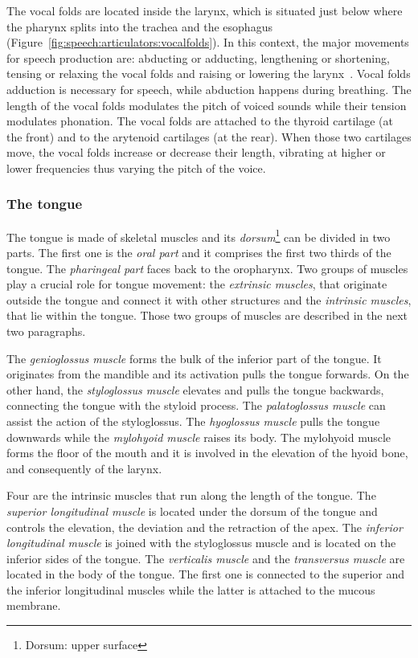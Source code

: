 
The vocal folds are located inside the larynx, which is situated just below
where the pharynx splits into the trachea and the esophagus
(Figure~\ref{fig:speech:articulators:vocalfolds}).
In this context, the major movements for speech production are: abducting or
adducting, lengthening or shortening, tensing or relaxing the vocal folds and 
raising or lowering the larynx~\citep{epstein.etal:2002}.
Vocal folds adduction is necessary for speech, while abduction happens
during breathing. The length of the vocal folds modulates the pitch of voiced
sounds while their tension modulates phonation.
The vocal folds are attached to the thyroid cartilage (at the front) and to the 
arytenoid cartilages (at the rear). When those two cartilages move, the vocal
folds increase or decrease their length, vibrating at higher or lower
frequencies thus varying the pitch of the voice. 

\subsubsection{The tongue}
The tongue is made of skeletal muscles and its \emph{dorsum}\footnote{Dorsum:
upper surface} can be divided in two parts.
The first one is the \emph{oral part} and it comprises the first two thirds of
the tongue. The \emph{pharingeal part} faces back to the oropharynx.
Two groups of muscles play a crucial role for tongue movement:
the \emph{extrinsic muscles}, that originate
outside the tongue and connect it with other structures 
and the \emph{intrinsic muscles}, that lie within the tongue.
Those two groups of muscles are described in the next two paragraphs.

The \emph{genioglossus muscle} forms the bulk of the inferior part of the
tongue. It originates from the mandible and its activation pulls the tongue 
forwards.
On the other hand, the \emph{styloglossus muscle} elevates and pulls the tongue
backwards, connecting the tongue with the styloid process.
The \emph{palatoglossus muscle} can assist the action of the styloglossus.
The \emph{hyoglossus muscle} pulls the tongue downwards while the 
\emph{mylohyoid muscle} raises its body.
The mylohyoid muscle forms the floor of the mouth and it is involved in the
elevation of the hyoid bone, and consequently of the larynx.


Four are the intrinsic muscles that run along the length of the tongue.
The \emph{superior longitudinal muscle} is located under the dorsum of the
tongue and controls the elevation, the deviation and the retraction of the apex.
The \emph{inferior longitudinal muscle} is joined with the styloglossus muscle
and is located on the inferior sides of the tongue.
The \emph{verticalis muscle} and the \emph{transversus muscle} are located in
the body of the tongue. The first one is connected to the superior and the
inferior longitudinal muscles while the latter is attached to the mucous
membrane.


